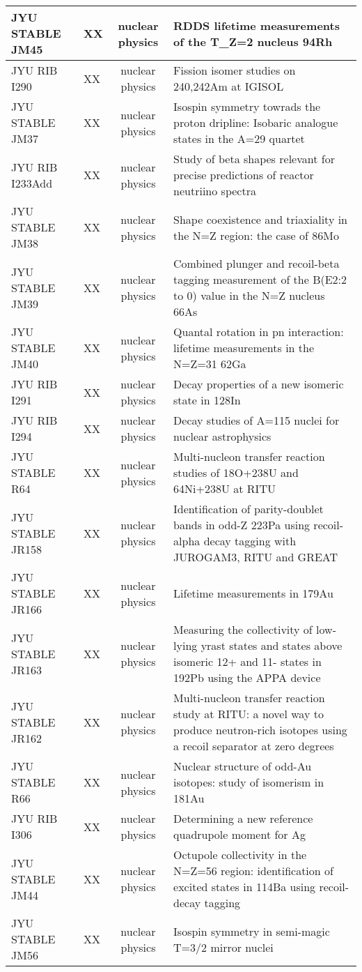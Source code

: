 \begin{xltabular}{\textwidth}{|l|p{0.12\textwidth}|c|Y|}
JYU STABLE JM45 & XX & nuclear physics & RDDS lifetime measurements of the T_Z=2 nucleus 94Rh \\ \hline
JYU RIB I290 & XX & nuclear physics & Fission isomer studies on 240,242Am at IGISOL \\ \hline
JYU STABLE JM37 & XX & nuclear physics & Isospin symmetry towrads the proton dripline: Isobaric analogue states in the A=29 quartet \\ \hline
JYU RIB I233Add & XX & nuclear physics & Study of beta shapes relevant for precise predictions of reactor neutriino spectra \\ \hline
JYU STABLE JM38 & XX & nuclear physics & Shape coexistence and triaxiality in the N=Z region: the case of 86Mo \\ \hline
JYU STABLE JM39 & XX & nuclear physics & Combined plunger and recoil-beta tagging measurement of the B(E2:2 to 0) value in the N=Z nucleus 66As \\ \hline
JYU STABLE JM40 & XX & nuclear physics & Quantal rotation in pn interaction: lifetime measurements in the N=Z=31 62Ga \\ \hline
JYU RIB I291 & XX & nuclear physics & Decay properties of a new isomeric state in 128In \\ \hline
JYU RIB I294 & XX & nuclear physics & Decay studies of A=115 nuclei for nuclear astrophysics \\ \hline
JYU STABLE R64 & XX & nuclear physics & Multi-nucleon transfer reaction studies of 18O+238U and 64Ni+238U at RITU \\ \hline
JYU STABLE JR158 & XX & nuclear physics & Identification of parity-doublet bands in odd-Z 223Pa using recoil-alpha decay tagging with JUROGAM3, RITU and GREAT\\ \hline
JYU STABLE JR166 & XX & nuclear physics & Lifetime measurements in 179Au \\ \hline
JYU STABLE JR163 & XX & nuclear physics & Measuring the collectivity of low-lying yrast states and states above isomeric 12+ and 11- states in 192Pb using the APPA device\\ \hline
JYU STABLE JR162 & XX & nuclear physics & Multi-nucleon transfer reaction study at RITU: a novel way to produce neutron-rich isotopes using a recoil separator at zero degrees \\ \hline
JYU STABLE R66 & XX & nuclear physics & Nuclear structure of odd-Au isotopes: study of isomerism in 181Au \\ \hline
JYU RIB I306 & XX & nuclear physics & Determining a new reference quadrupole moment for Ag \\ \hline
JYU STABLE JM44 & XX & nuclear physics & Octupole collectivity in the N=Z=56 region: identification of excited states in 114Ba using recoil-decay tagging \\ \hline
JYU STABLE JM56 & XX & nuclear physics & Isospin symmetry in semi-magic T=3/2 mirror nuclei \\ \hline
\end{xltabular}

